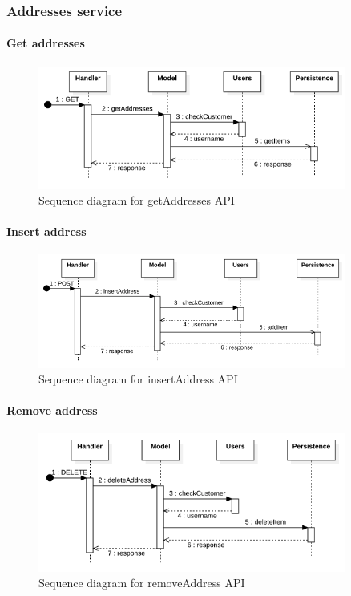 \subsubsection{Addresses service}

\paragraph*{Get addresses}
\begin{figure}[H]
    \includegraphics[width=0.9\textwidth]{res/images/sequence-diagrams/addresses/getAddresses.png}
    \caption{Sequence diagram for getAddresses API}
\end{figure}

\paragraph*{Insert address}
\begin{figure}[H]
    \includegraphics[width=0.9\textwidth]{res/images/sequence-diagrams/addresses/insertAddress.png}
    \caption{Sequence diagram for insertAddress API}
\end{figure}

\paragraph*{Remove address}
\begin{figure}[H]
    \includegraphics[width=0.9\textwidth]{res/images/sequence-diagrams/addresses/removeAddress.png}
    \caption{Sequence diagram for removeAddress API}
\end{figure}

